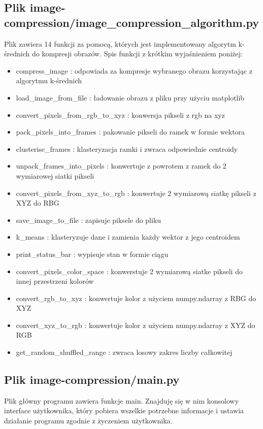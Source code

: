 \documentclass{classrep}
\begin{document}
{\subsection{Plik image-compression/image\_compression\_algorithm.py}
{
Plik zawiera 14 funkcji za pomocą, których jest implementowany algorytm k-średnich do kompresji obrazów.
Spis funkcji z krótkim wyjaśnieniem poniżej:
\begin{itemize}
\item compress\_image : odpowiada za kompresje wybranego obrazu korzystając z algorytmu k-średnich
\item load\_image\_from\_file : ładowanie obrazu z pliku przy użyciu matplotlib
\item convert\_pixels\_from\_rgb\_to\_xyz : konwersja pikseli z rgb na xyz
\item pack\_pixels\_into\_frames : pakowanie pikseli do ramek w formie wektora
\item clusterise\_frames : klasteryzacja ramki i zwraca odpowiednie centroidy
\item unpack\_frames\_into\_pixels : konwertuje z powrotem z ramek do 2 wymiarowej siatki pikseli
\item convert\_pixels\_from\_xyz\_to\_rgb : konwertuje 2 wymiarową siatkę pikseli z XYZ do RBG
\item save\_image\_to\_file : zapisuje piksele do pliku
\item k\_means : klasteryzuje dane i zamienia każdy wektor z jego centroidem
\item print\_status\_bar : wypisuje stan w formie ciągu
\item convert\_pixels\_color\_space : konwerstuje 2 wymiarową siatke pikseli do innej przestrzeni kolorów
\item convert\_rgb\_to\_xyz : konwertuje kolor z użyciem numpy.ndarray z RBG do XYZ
\item convert\_xyz\_to\_rgb : konwertuje kolor z użyciem numpy.ndarray z XYZ do RGB
\item get\_random\_shuffled\_range : zwraca losowy zakres liczby całkowitej
\end{itemize}
}
\subsection{Plik image-compression/main.py}
{
Plik główny programu zawiera funkcje main. Znajduję się w nim konsolowy interface użytkownika,
który pobiera wszelkie potrzebne informacje i ustawia działanie programu zgodnie z życzeniem użytkownika.
}
}
\end{document}
